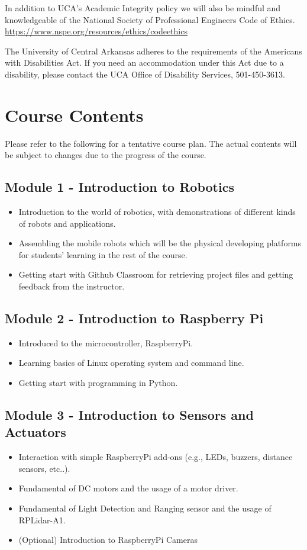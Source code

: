 \documentclass[11pt,letterpaper]{article}
\begin{document}
In addition to UCA’s Academic Integrity policy we will also be mindful and knowledgeable of the National
Society of Professional Engineers Code of Ethics. \\
\href{https://www.nspe.org/resources/ethics/codeethics}{https://www.nspe.org/resources/ethics/codeethics}

The University of Central Arkansas adheres to the requirements of the Americans with Disabilities Act. If you need an accommodation under this Act due to a disability, please contact the UCA Office of Disability Services, 501-450-3613.


\section*{Course Contents}
Please refer to the following for a tentative course plan. The actual contents will be subject to changes due to the progress of the course.

\subsection*{Module 1 - Introduction to Robotics}
\begin{itemize}
    \item Introduction to the world of robotics, with demonstrations of different kinds of robots and applications.
    \item Assembling the mobile robots which will be the physical developing platforms for students' learning in the rest of the course.
    \item Getting start with Github Classroom for retrieving project files and getting feedback from the instructor.
\end{itemize}
 
\subsection*{Module 2 - Introduction to Raspberry Pi}
\begin{itemize}
    \item Introduced to the microcontroller, RaspberryPi.
    \item Learning basics of Linux operating system and command line.
    \item Getting start with programming in Python.
\end{itemize}

\subsection*{Module 3 - Introduction to Sensors and Actuators}
\begin{itemize}
    \item Interaction with simple RaspberryPi add-ons (e.g., LEDs, buzzers, distance sensors, etc..).
    \item Fundamental of DC motors and the usage of a motor driver.
    \item Fundamental of Light Detection and Ranging sensor and the usage of RPLidar-A1.
    \item (Optional) Introduction to RaspberryPi Cameras
\end{itemize}
\end{document}

